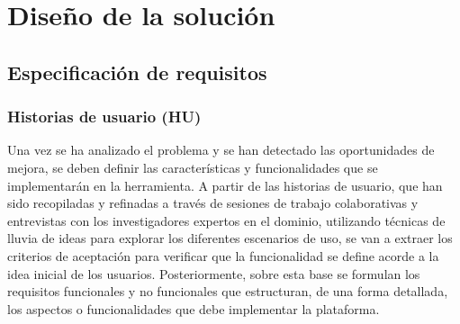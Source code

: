 \chapter{Diseño de la solución}
\label{chap:diseño}
\section{Especificación de requisitos}
\label{section:especificación}

\subsection{Historias de usuario (HU)}
Una vez se ha analizado el problema y se han detectado las oportunidades de mejora, se deben definir las características y funcionalidades que se implementarán en la herramienta. A partir de las historias de usuario, que han sido recopiladas y refinadas a través de sesiones de trabajo colaborativas y entrevistas con los investigadores expertos en el dominio, utilizando técnicas de lluvia de ideas para explorar los diferentes escenarios de uso, se van a extraer los criterios de aceptación para verificar que la funcionalidad se define acorde a la idea inicial de los usuarios. Posteriormente, sobre esta base se formulan los requisitos funcionales y no funcionales que estructuran, de una forma detallada, los aspectos o funcionalidades que debe implementar la plataforma.


